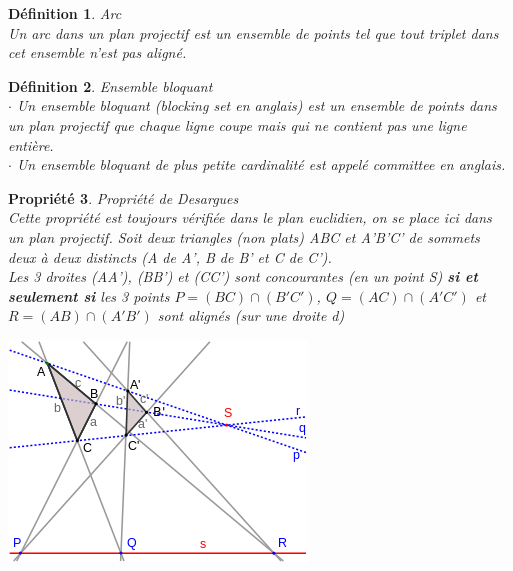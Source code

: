 \documentclass[a4paper]{article}
\newtheorem{Def}{Définition}[section]
\newtheorem{Propr}[Def]{Propriété}
\begin{document}
\begin{Def}{Arc} \\
  Un arc dans un plan projectif est un ensemble de points tel que tout triplet dans cet ensemble n'est pas aligné.
\end{Def}
\begin{Def}{Ensemble bloquant}\\
 $\cdot$ Un ensemble bloquant (\emph{blocking set} en anglais) est un ensemble de points dans un plan projectif que chaque ligne coupe mais qui ne contient pas une ligne entière.\\
  $\cdot$ Un ensemble bloquant de plus petite cardinalité est appelé \emph{committee} en anglais.\\
\end{Def}
\bigskip
\begin{Propr}{Propriété de Desargues}\\
Cette propriété est toujours vérifiée dans le plan euclidien, on se place ici dans un plan projectif.
  Soit deux triangles (non plats) ABC et A'B'C' de sommets deux à deux distincts (A de A', B de B' et C de C'). \\
  Les 3 droites (AA'), (BB') et (CC') sont concourantes (en un point S) \textbf{si et seulement si} les 3 points $P = (BC) \cap (B'C')$, $Q = (AC) \cap (A'C')$ et $R = (AB) \cap (A'B')$ sont alignés (sur une droite d)
  \end{Propr}
\begin{center}
\includegraphics[scale=0.6]{desargues.png}  
\end{center}  
\newpage
\end{document}
